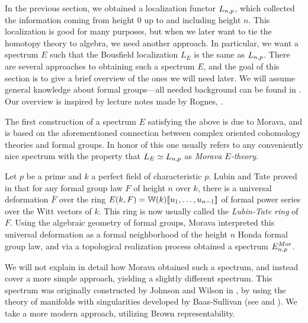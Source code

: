 In the previous section, we obtained a localization functor $L_{n,p}$, which collected the information coming from height $0$ up to and including height $n$. This localization is good for many purposes, but when we later want to tie the homotopy theory to algebra, we need another approach. In particular, we want a spectrum $E$ such that the Bousfield localization $L_E$ is the same as $L_{n,p}$. There are several approaches to obtaining such a spectrum $E$, and the goal of this section is to give a brief overview of the ones we will need later. We will assume general knowledge about formal groups---all needed background can be found in \cite[Appendix 2]{ravenel_86}. Our overview is inspired by lecture notes made by Rognes, \cite{rognes_2023}. 

The first construction of a spectrum $E$ satisfying the above is due to Morava, and is based on the aforementioned connection between complex oriented cohomology theories and formal groups. In honor of this one usually refers to any conveniently nice spectrum with the property that $L_E \simeq L_{n,p}$ as \emph{Morava $E$-theory}.

\begin{construction}
    Let $p$ be a prime and $k$ a perfect field of characteristic $p$. Lubin and Tate proved in \cite{lubin-tate_66} that for any formal group law $F$ of height $n$ over $k$, there is a universal deformation $\bar{F}$ over the ring $E(k, F)=\mathbb{W}(k)[\![ u_1, \ldots, u_{n-1}]\!]$ of formal power series over the Witt vectors of $k$. This ring is now usually called the \emph{Lubin-Tate ring} of $F$. Using the algebraic geometry of formal groups, Morava interpreted this universal deformation as a formal neighborhood of the height $n$ Honda formal group law, and via a topological realization process obtained a spectrum $E^{Mor}_{n,p}$.
\end{construction}

We will not explain in detail how Morava obtained such a spectrum, and instead cover a more simple approach, yielding a slightly different spectrum. This spectrum was originally constructed by Johnson and Wilson in \cite{johnson-wilson_75}, by using the theory of manifolds with singularities developed by Baas-Sullivan (see \cite{baas_73a} and \cite{baas_73b}). We take a more modern approach, utilizing Brown representability. 

